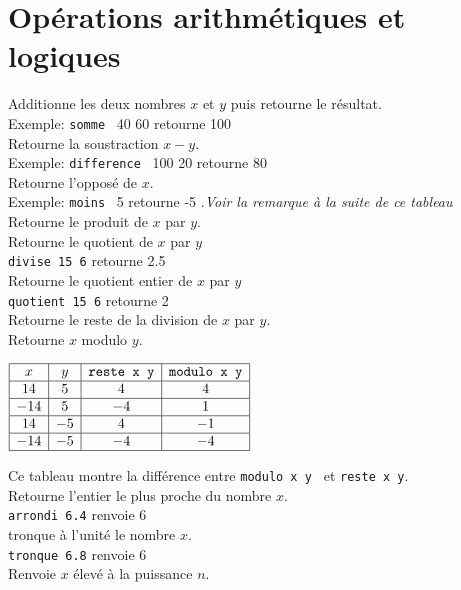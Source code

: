 \section{Opérations arithmétiques et logiques}
\noindent
{}
 Additionne les deux nombres $x$ et $y$ puis retourne le résultat. \\
 Exemple: \texttt{somme} \ 40 60 retourne 100\\
 Retourne la soustraction $x-y$.\\
 Exemple: \texttt{difference} \ 100 20 retourne 80\\
 Retourne l'opposé de $x$. \\
 Exemple: \texttt{moins} \ 5 retourne -5 .\emph{Voir la remarque à la
suite de ce tableau}\\
 Retourne le produit de $x$ par $y$.\\
 Retourne le quotient de $x$ par $y$\\
 \texttt{divise 15 6} retourne 2.5\\
 Retourne le quotient entier de $x$ par $y$\\
\texttt{quotient 15 6} retourne 2\\
 Retourne le reste de la division de $x$ par $y$.\\
 Retourne $x$ modulo $y$. 
\begin{center}
 $\begin{array}{|c|c|c|c|}
 \hline
x & y & \textrm{\texttt{reste x y}} & \textrm{\texttt{modulo x y}} \\
\hline
14 & 5 & 4& 4\\
\hline
-14 & 5 &-4 & 1\\
\hline
14 & -5 & 4 & -1\\
\hline
-14 & -5 & -4 & -4 \\
\hline
\end{array}
$
\end{center}
Ce tableau montre la différence entre \texttt{modulo x y } et  \texttt{reste x y}.\\
 Retourne l'entier le plus proche du nombre $x$.\\
\texttt{arrondi 6.4} renvoie 6\\
 tronque à l'unité le nombre $x$.\\
 \texttt{tronque 6.8}  renvoie 6\\
 Renvoie $x$ élevé à la puissance $n$.\\
